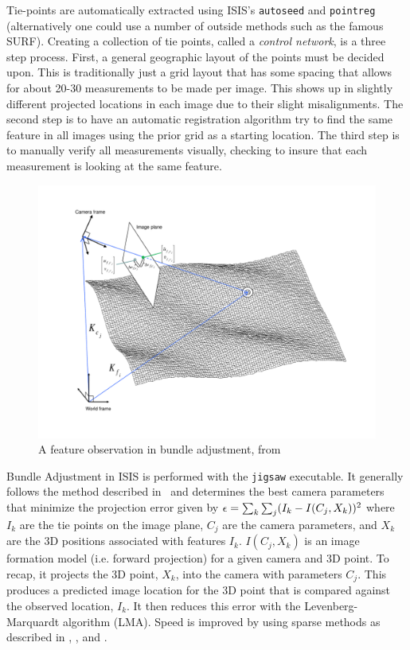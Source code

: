 Tie-points are automatically extracted using \ac{ISIS}'s
\texttt{autoseed} and \texttt{pointreg} (alternatively one could use a
number of outside methods such as the famous SURF\citep{surf08}).
Creating a collection of tie points, called a {\it control network}, is
a three step process. First, a general geographic layout of the points
must be decided upon. This is traditionally just a grid layout that has
some spacing that allows for about 20-30 measurements to be made per
image. This shows up in slightly different projected
locations in each image due to their slight misalignments. The second step
is to have an automatic registration algorithm try to find the same feature
in all images using the prior grid as a starting location. The third
step is to manually verify all measurements visually, checking to insure
that each measurement is looking at the same feature.

\begin{figure}[b!]
  \begin{center}
  \includegraphics[trim=20mm 20mm 20mm 15mm,clip,width=6in]{images/ba_feature_observation.pdf}
  \end{center}
  \caption{ A feature observation in bundle adjustment, from \citet{moore09} }
  \label{fig:ba_feature}
\end{figure}

Bundle Adjustment in \ac{ISIS} is performed with the \texttt{jigsaw}
executable. It generally follows the method described
in~\cite{triggs00} and determines the best camera parameters that
minimize the projection error given by ${\bf \epsilon} =
\sum_k\sum_j(I_k-I(C_j, X_k))^2$ where $I_k$ are the tie points on the
image plane, $C_j$ are the camera parameters, and $X_k$ are the 3D
positions associated with features $I_k$. $I(C_j, X_k)$ is an image
formation model (i.e. forward projection) for a given camera and 3D
point. To recap, it projects the 3D point, $X_k$, into the camera with
parameters $C_j$. This produces a predicted image location for the 3D
point that is compared against the observed location, $I_k$. It then
reduces this error with the Levenberg-Marquardt algorithm (LMA). Speed
is improved by using sparse methods as described in \citet{hartley04},
\citet{konolige:sparsesparse}, and \citet{cholmod}.


